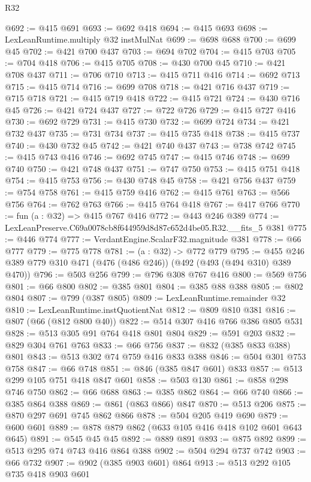 \begin{lexlean}{R32}
\begin{coremodule}
@692 := @415 @691
@693 := @692 @418
@694 := @415 @693
@698 := LexLeanRuntime.multiply @32 instMulNat
@699 := @698 @688
@700 := @699 @45
@702 := @421 @700 @437
@703 := @694 @702
@704 := @415 @703
@705 := @704 @418
@706 := @415 @705
@708 := @430 @700 @45
@710 := @421 @708 @437
@711 := @706 @710
@713 := @415 @711 @416
@714 := @692 @713
@715 := @415 @714
@716 := @699 @708
@718 := @421 @716 @437
@719 := @715 @718
@721 := @415 @719 @418
@722 := @415 @721
@724 := @430 @716 @45
@726 := @421 @724 @437
@727 := @722 @726
@729 := @415 @727 @416
@730 := @692 @729
@731 := @415 @730
@732 := @699 @724
@734 := @421 @732 @437
@735 := @731 @734
@737 := @415 @735 @418
@738 := @415 @737
@740 := @430 @732 @45
@742 := @421 @740 @437
@743 := @738 @742
@745 := @415 @743 @416
@746 := @692 @745
@747 := @415 @746
@748 := @699 @740
@750 := @421 @748 @437
@751 := @747 @750
@753 := @415 @751 @418
@754 := @415 @753
@756 := @430 @748 @45
@758 := @421 @756 @437
@759 := @754 @758
@761 := @415 @759 @416
@762 := @415 @761
@763 := @566 @756
@764 := @762 @763
@766 := @415 @764 @418
@767 := @417 @766
@770 := fun (a : @32) => @415 @767 @416
@772 := @443 @246 @389
@774 := LexLeanPreserve.C69a0078cb8f644959d8d87c652d4be05.R32.__fits_5 @381
@775 := @446 @774
@777 := VerdantEngine.ScalarF32.magnitude @381
@778 := @66 @777
@779 := @775 @778
@781 := (a : @32) -> @772 @779
@795 := @455 @246 @389 @779 @310 @471 (@476 (@486 @246)) (@492 (@493 (@494 @310) @389 @470))
@796 := @503 @256
@799 := @796 @308 @767 @416
@800 := @569 @756
@801 := @66 @800
@802 := @385 @801
@804 := @385 @88 @388
@805 := @802 @804
@807 := @799 (@387 @805)
@809 := LexLeanRuntime.remainder @32
@810 := LexLeanRuntime.instQuotientNat
@812 := @809 @810 @381
@816 := @807 (@66 (@812 @800 @40))
@822 := @514 @307 @416 @766 @386 @805 @531
@828 := @513 @305 @91 @764 @418 @801 @804
@829 := @591 @203
@832 := @829 @304 @761 @763
@833 := @66 @756
@837 := @832 (@385 @833 @388) @801
@843 := @513 @302 @74 @759 @416 @833 @388
@846 := @504 @301 @753 @758
@847 := @66 @748
@851 := @846 (@385 @847 @601) @833
@857 := @513 @299 @105 @751 @418 @847 @601
@858 := @503 @130
@861 := @858 @298 @746 @750
@862 := @66 @688
@863 := @385 @862
@864 := @66 @740
@866 := @385 @864 @388
@869 := @861 (@863 @866) @847
@870 := @513 @206
@875 := @870 @297 @691 @745 @862 @866
@878 := @504 @205 @419 @690
@879 := @600 @601
@889 := @878 @879 @862 (@633 @105 @416 @418 @102 @601 @643 @645)
@891 := @545 @45 @45
@892 := @889 @891
@893 := @875 @892
@899 := @513 @295 @74 @743 @416 @864 @388
@902 := @504 @294 @737 @742
@903 := @66 @732
@907 := @902 (@385 @903 @601) @864
@913 := @513 @292 @105 @735 @418 @903 @601

\end{coremodule}
\end{lexlean}
